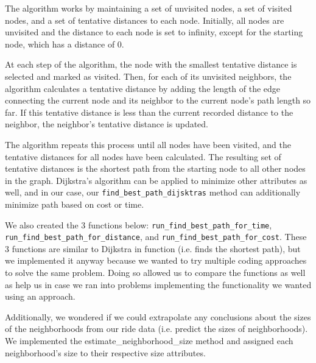 \documentclass[fontsize=11pt]{article}
\begin{document}
The algorithm works by maintaining a set of unvisited nodes, a set of visited nodes, and a set of tentative distances to each node. Initially, all nodes are unvisited and the distance to each node is set to infinity, except for the starting node, which has a distance of 0. \newline

At each step of the algorithm, the node with the smallest tentative distance is selected and marked as visited. Then, for each of its unvisited neighbors, the algorithm calculates a tentative distance by adding the length of the edge connecting the current node and its neighbor to the current node's path length so far. If this tentative distance is less than the current recorded distance to the neighbor, the neighbor's tentative distance is updated. \newline

The algorithm repeats this process until all nodes have been visited, and the tentative distances for all nodes have been calculated. The resulting set of tentative distances is the shortest path from the starting node to all other nodes in the graph. Dijkstra's algorithm can be applied to minimize other attributes as well, and in our case, our \texttt{find\_best\_path\_dijsktras} method can additionally minimize path based on cost or time.\newline

We also created the 3 functions below:
\texttt{run\_find\_best\_path\_for\_time},
\texttt{run\_find\_best\_path\_for\_distance}, and \texttt{run\_find\_best\_path\_for\_cost}. These 3 functions are similar to Dijkstra in function (i.e. finds the shortest path), but we implemented it anyway because we wanted to try multiple coding approaches to solve the same problem. Doing so allowed us to compare the functions as well as help us in case we ran into problems implementing the functionality we wanted using an approach. \newline

Additionally, we wondered if we could extrapolate any conclusions about the sizes of the neighborhoods from our ride data (i.e. predict the sizes of neighborhoods). We implemented the estimate\_neighborhood\_size method and assigned each neighborhood's size to their respective size attributes. \newline
\end{document}
